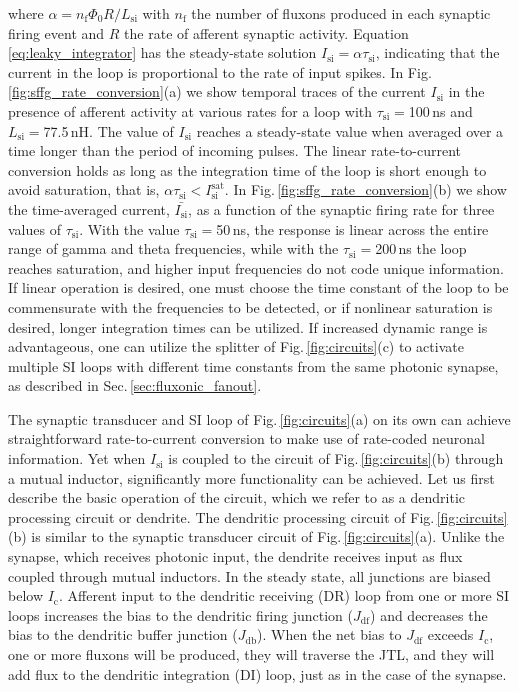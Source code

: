 \documentclass[twocolumn]{article}
\begin{document}
where $\alpha = n_{\mathrm{f}} \Phi_0 R/L_{\mathrm{si}}$ with $n_{\mathrm{f}}$ the number of fluxons produced in each synaptic firing event and $R$ the rate of afferent synaptic activity. Equation \ref{eq:leaky_integrator} has the steady-state solution $I_{\mathrm{si}} = \alpha \tau_{\mathrm{si}}$, indicating that the current in the loop is proportional to the rate of input spikes. In Fig.\,\ref{fig:sffg_rate_conversion}(a) we show temporal traces of the current $I_{\mathrm{si}}$ in the presence of afferent activity at various rates for a loop with $\tau_{\mathrm{si}} = $100\,ns and $L_{\mathrm{si}} = $77.5\,nH. The value of $I_{\mathrm{si}}$ reaches a steady-state value when averaged over a time longer than the period of incoming pulses. The linear rate-to-current conversion holds as long as the integration time of the loop is short enough to avoid saturation, that is, $\alpha \tau_{\mathrm{si}} < I_{\mathrm{si}}^{\mathrm{sat}}$. In Fig.\,\ref{fig:sffg_rate_conversion}(b) we show the time-averaged current, $\bar{I_{\mathrm{si}}}$, as a function of the synaptic firing rate for three values of $\tau_{\mathrm{si}}$. With the value $\tau_{\mathrm{si}} = $50\,ns, the response is linear across the entire range of gamma and theta frequencies, while with the $\tau_{\mathrm{si}} = $200\,ns the loop reaches saturation, and higher input frequencies do not code unique information. If linear operation is desired, one must choose the time constant of the loop to be commensurate with the frequencies to be detected, or if nonlinear saturation is desired, longer integration times can be utilized. If increased dynamic range is advantageous, one can utilize the splitter of Fig.\,\ref{fig:circuits}(c) to activate multiple SI loops with different time constants from the same photonic synapse, as described in Sec.\,\ref{sec:fluxonic_fanout}.

The synaptic transducer and SI loop of Fig.\,\ref{fig:circuits}(a) on its own can achieve straightforward rate-to-current conversion to make use of rate-coded neuronal information. Yet when $I_{\mathrm{si}}$ is coupled to the circuit of Fig.\,\ref{fig:circuits}(b) through a mutual inductor, significantly more functionality can be achieved. Let us first describe the basic operation of the circuit, which we refer to as a dendritic processing circuit or dendrite. The dendritic processing circuit of Fig.\,\ref{fig:circuits}(b) is similar to the synaptic transducer circuit of Fig.\,\ref{fig:circuits}(a). Unlike the synapse, which receives photonic input, the dendrite receives input as flux coupled through mutual inductors. In the steady state, all junctions are biased below $I_{\mathrm{c}}$. Afferent input to the dendritic receiving (DR) loop from one or more SI loops increases the bias to the dendritic firing junction ($J_{\mathrm{df}}$) and decreases the bias to the dendritic buffer junction ($J_{\mathrm{db}}$). When the net bias to $J_{\mathrm{df}}$ exceeds $I_{\mathrm{c}}$, one or more fluxons will be produced, they will traverse the JTL, and they will add flux to the dendritic integration (DI) loop, just as in the case of the synapse. 
\end{document}
